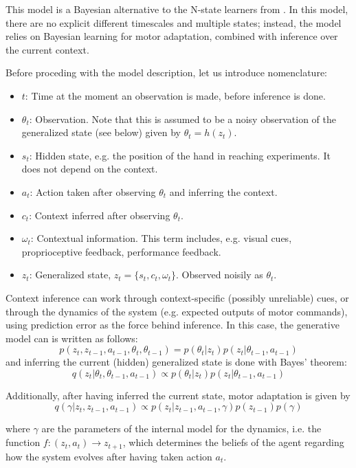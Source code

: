 \documentclass[a4paper,doc,floatsintext,natbib]{apa6}
\begin{document}
This model is a Bayesian alternative to the N-state learners from
\citep[e.g.][]{Lee_Dual_2009}. In this model, there are no explicit different
timescales and multiple states; instead, the model relies on Bayesian learning
for motor adaptation, combined with inference over the current context.

Before proceding with the model description, let us introduce nomenclature:
\begin{itemize}
\item $t$: Time at the moment an observation is made, before inference is done.
\item $\theta_t$: Observation. Note that this is assumed to be a noisy
observation of the generalized state (see below) given by $\theta_t = h(z_t)$.
\item $s_t$: Hidden state, e.g. the position of the hand in reaching
experiments. It does not depend on the context.
\item $a_t$: Action taken after observing $\theta_t$ and inferring the context.
\item $c_t$: Context inferred after observing $\theta_t$.
\item $\omega_t$: Contextual information. This term includes, e.g. visual cues,
proprioceptive feedback, performance feedback.
\item $z_t$: Generalized state, $z_t = \{s_t, c_t, \omega_t\}$. Observed noisily
as $\theta_t$.
\end{itemize}

Context inference can work through context-specific (possibly unreliable) cues,
or through the dynamics of the system (e.g. expected outputs of motor
commands), using prediction error as the force behind inference. In this case,
the generative model can is written as follows:
\[
p(z_t, z_{t-1}, a_{t-1}, \theta_t, \theta_{t-1}) = p(\theta_t | z_t)p(z_t|\theta_{t-1}, a_{t-1})
\]
and inferring the current (hidden) generalized state is done with Bayes' theorem:
\[
  q(z_t | \theta_t, \theta_{t-1}, a_{t-1}) \propto p(\theta_t | z_t)p(z_t|\theta_{t-1}, a_{t-1})
\]
  
Additionally, after having inferred the current state, motor adaptation is given by
\[
q(\gamma | z_t, z_{t-1}, a_{t-1}) \propto p(z_t | z_{t-1}, a_{t-1}, \gamma)p(z_{t-1})p(\gamma)
\]

where $\gamma$ are the parameters of the internal model for the dynamics,
i.e. the function $f: (z_t, a_t) \rightarrow z_{t+1}$, which determines the beliefs of
the agent regarding how the system evolves after having taken action $a_t$.
\end{document}
